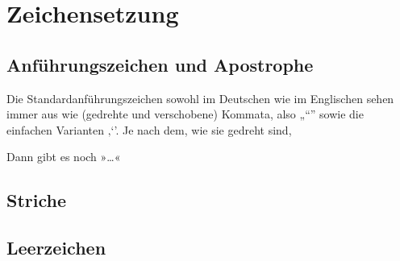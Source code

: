 \chapter{Zeichensetzung}

\lipsum[1]

\section{Anführungszeichen und Apostrophe}

Die Standardanführungszeichen sowohl im Deutschen wie im Englischen sehen immer
aus wie (gedrehte und verschobene) Kommata, also „“” sowie die einfachen
Varianten ‚‘’. Je nach dem, wie sie gedreht sind,

Dann gibt es noch »…«

\section{Striche}

\section{Leerzeichen}

